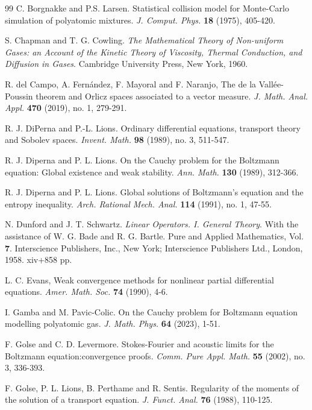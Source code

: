 \documentclass[reqno,11pt]{amsart}
\numberwithin{equation}{section}
\begin{document}
\begin{thebibliography}{99}
 C. Borgnakke and P.S. Larsen. Statistical collision model for Monte-Carlo simulation of polyatomic mixtures. {\em J. Comput. Phys.} {\bf 18} (1975), 405-420.

 S. Chapman and T. G. Cowling. {\em The Mathematical Theory of Non-uniform Gases: an Account of the Kinetic Theory of Viscosity, Thermal Conduction, and Diffusion in Gases}. Cambridge University Press, New York, 1960.


R. del Campo, A. Fernández, F. Mayoral and F. Naranjo, The de la Vallée-Poussin theorem and Orlicz spaces associated to a vector measure. {\em J. Math. Anal. Appl.} {\bf 470} (2019), no. 1,  279-291.
    
 R. J. DiPerna and P.-L. Lions. Ordinary differential equations, transport theory and Sobolev spaces. {\em Invent. Math.} {\bf 98} (1989), no. 3, 511-547.

 R. J. Diperna and P. L. Lions. On the Cauchy problem for the Boltzmann equation: Global existence and weak stability. {\em Ann. Math.} {\bf 130} (1989), 312-366.
    
 R. J. Diperna and P. L. Lions. Global solutions of Boltzmann's equation and the entropy inequality. {\em Arch. Rational Mech. Anal.} {\bf 114} (1991), no. 1, 47-55.

 N. Dunford and J. T. Schwartz. {\em Linear Operators. I. General Theory}. With the assistance of W. G. Bade and R. G. Bartle. Pure and Applied Mathematics, Vol. {\bf 7}. Interscience Publishers, Inc., New York; Interscience Publishers Ltd., London, 1958. xiv+858 pp.

 L. C. Evans, Weak convergence methods for nonlinear partial differential equations. {\em Amer. Math. Soc.} {\bf 74} (1990), 4-6.

 I. Gamba and M. Pavic-Colic. On the Cauchy problem for Boltzmann equation modelling polyatomic gas. {\em J. Math. Phys.} {\bf 64 } (2023), 1-51.

    
 F. Golse and C. D. Levermore. Stokes-Fourier and acoustic limits for the Boltzmann equation:convergence proofs. {\em Comm. Pure Appl. Math.} {\bf 55} (2002), no. 3, 336-393.

F. Golse, P. L. Lions, B. Perthame and R. Sentis. Regularity of the moments of the solution of a transport equation. {\em J. Funct. Anal.} {\bf 76} (1988), 110-125.


\end{thebibliography}
\end{document}
